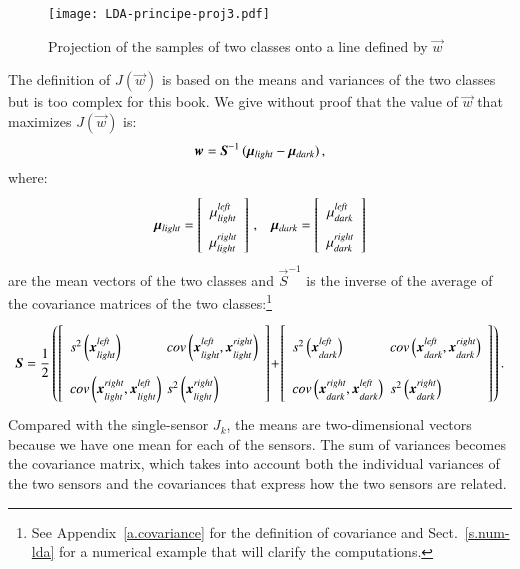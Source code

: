 \begin{figure}
\begin{center}
\texttt{[image: LDA-principe-proj3.pdf]}
\end{center}
\caption{Projection of the samples of two classes onto a line defined by $\vec{w}$}\label{fig.lda-proj}
\end{figure}

The definition of $J(\vec{w})$ is based on the means and variances of the two classes but is too complex for this book. We give without proof that the value of $\vec{w}$ that maximizes $J(\vec{w})$ is:
\begin{equation}
\vec{w} = \vec{S}^{-1}\,(\vec{\mu_{\sub{light}}}-\vec{\mu_{\sub{dark}}})\,,\label{eq.wLDA}
\end{equation}
where:
\[
\renewcommand{\arraystretch}{1.8}
\vec{\mu_{\sub{light}}}=\left[
\begin{array}{c}\mu_{\sub{light}}^{\sub{left}}\\
\mu_{\sub{light}}^{\sub{right}}\end{array}
\right]\,,\;\;\;
\vec{\mu_{\sub{dark}}}=\left[
\begin{array}{c}\mu_{\sub{dark}}^{\sub{left}}\\
\mu_{\sub{dark}}^{\sub{right}}\end{array}\right]
\]
are the mean vectors of the two classes and $\vec{S}^{-1}$ is the inverse of the average of the covariance matrices of the two classes:\footnote{See Appendix~\ref{a.covariance} for the definition of covariance and Sect.~\ref{s.num-lda} for a numerical example that will clarify the computations.}
\[
\renewcommand{\arraystretch}{2.5}
\vec{S} = \frac{1}{2}\left(
\left[\begin{array}{l@{\hspace{.4em}}l}
s^2\left(\vec{x^{\sub{left}}_\sub{light}}\right) &
\textit{cov}\left(\vec{x^{\sub{left}}_\sub{light}},\vec{x^{\sub{right}}_\sub{light}}\right)\\
\textit{cov}\left(\vec{x^{\sub{right}}_\sub{light}},\vec{x^{\sub{left}}_\sub{light}}\right)&
s^2\left(\vec{x^{\sub{right}}_\sub{light}}\right)
\end{array}\right]
\!+\!
\left[\begin{array}{l@{\hspace{.5em}}l}
s^2\left(\vec{x^{\sub{left}}_\sub{dark}}\right)&
\textit{cov}\left(\vec{x^{\sub{left}}_\sub{dark}},\vec{x^{\sub{right}}_\sub{dark}}\right)\\
\textit{cov}\left(\vec{x^{\sub{right}}_\sub{dark}},\vec{x^{\sub{left}}_\sub{dark}}\right)&
s^2\left(\vec{x^{\sub{right}}_\sub{dark}}\right)
\end{array}\right]\right).
\]
Compared with the single-sensor $J_k$, the means are two-dimensional vectors because we have one mean for each of the sensors. The sum of variances becomes the covariance matrix, which takes into account both the individual variances of the two sensors and the covariances that express how the two sensors are related.

